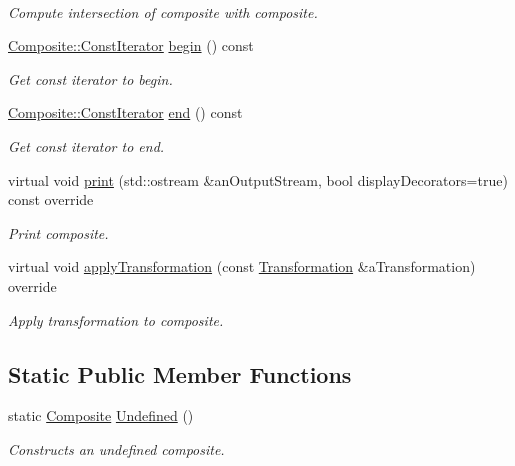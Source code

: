 \begin{DoxyCompactItemize}
$$\begin{DoxyCompactList}\small\item\em Compute intersection of composite with composite. \end{DoxyCompactList}\item 
\hyperlink{classostk_1_1math_1_1geom_1_1d3_1_1objects_1_1_composite_ab1f78408fec2e435dc1172cf2675b0a9}{Composite\+::\+Const\+Iterator} \hyperlink{classostk_1_1math_1_1geom_1_1d3_1_1objects_1_1_composite_ab94b6cd4186515bdc1fa246756fec3cb}{begin} () const
\begin{DoxyCompactList}\small\item\em Get const iterator to begin. \end{DoxyCompactList}\item 
\hyperlink{classostk_1_1math_1_1geom_1_1d3_1_1objects_1_1_composite_ab1f78408fec2e435dc1172cf2675b0a9}{Composite\+::\+Const\+Iterator} \hyperlink{classostk_1_1math_1_1geom_1_1d3_1_1objects_1_1_composite_abaaf231b9d0b5924ceb2b89db38cfe25}{end} () const
\begin{DoxyCompactList}\small\item\em Get const iterator to end. \end{DoxyCompactList}\item 
virtual void \hyperlink{classostk_1_1math_1_1geom_1_1d3_1_1objects_1_1_composite_afa4ff037d2ab625c650ef0e45c6ea4e6}{print} (std\+::ostream \&an\+Output\+Stream, bool display\+Decorators=true) const override
\begin{DoxyCompactList}\small\item\em Print composite. \end{DoxyCompactList}\item 
virtual void \hyperlink{classostk_1_1math_1_1geom_1_1d3_1_1objects_1_1_composite_a2d99d6b4096c2f5ba3175f886e2e2c7d}{apply\+Transformation} (const \hyperlink{classostk_1_1math_1_1geom_1_1d3_1_1_transformation}{Transformation} \&a\+Transformation) override
\begin{DoxyCompactList}\small\item\em Apply transformation to composite. \end{DoxyCompactList}\end{DoxyCompactItemize}
\subsection*{Static Public Member Functions}
\begin{DoxyCompactItemize}
\item 
static \hyperlink{classostk_1_1math_1_1geom_1_1d3_1_1objects_1_1_composite}{Composite} \hyperlink{classostk_1_1math_1_1geom_1_1d3_1_1objects_1_1_composite_abd7585518f349e7d599a81102f9e0e41}{Undefined} ()
\begin{DoxyCompactList}\small\item\em Constructs an undefined composite. \end{DoxyCompactList}\end{DoxyCompactItemize}


